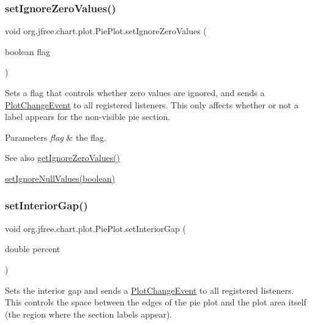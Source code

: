 \subsubsection{\texorpdfstring{set\+Ignore\+Zero\+Values()}{setIgnoreZeroValues()}}
{\footnotesize\ttfamily void org.\+jfree.\+chart.\+plot.\+Pie\+Plot.\+set\+Ignore\+Zero\+Values (\begin{DoxyParamCaption}\item[{boolean}]{flag }\end{DoxyParamCaption})}

Sets a flag that controls whether zero values are ignored, and sends a \mbox{\hyperlink{}{Plot\+Change\+Event}} to all registered listeners. This only affects whether or not a label appears for the non-\/visible pie section.


\begin{DoxyParams}{Parameters}
{\em flag} & the flag.\\
\hline
\end{DoxyParams}
\begin{DoxySeeAlso}{See also}
\mbox{\hyperlink{classorg_1_1jfree_1_1chart_1_1plot_1_1_pie_plot_a8406857ddf597ed96eee37a8bdb53ba1}{get\+Ignore\+Zero\+Values()}} 

\mbox{\hyperlink{classorg_1_1jfree_1_1chart_1_1plot_1_1_pie_plot_a618349ca4f4880ab09be7e6cb5e5c4af}{set\+Ignore\+Null\+Values(boolean)}} 
\end{DoxySeeAlso}
\mbox{\label{classorg_1_1jfree_1_1chart_1_1plot_1_1_pie_plot_ae35995953830e84173411620ffa8549d}} 
\subsubsection{\texorpdfstring{set\+Interior\+Gap()}{setInteriorGap()}}
{\footnotesize\ttfamily void org.\+jfree.\+chart.\+plot.\+Pie\+Plot.\+set\+Interior\+Gap (\begin{DoxyParamCaption}\item[{double}]{percent }\end{DoxyParamCaption})}

Sets the interior gap and sends a \mbox{\hyperlink{}{Plot\+Change\+Event}} to all registered listeners. This controls the space between the edges of the pie plot and the plot area itself (the region where the section labels appear).


